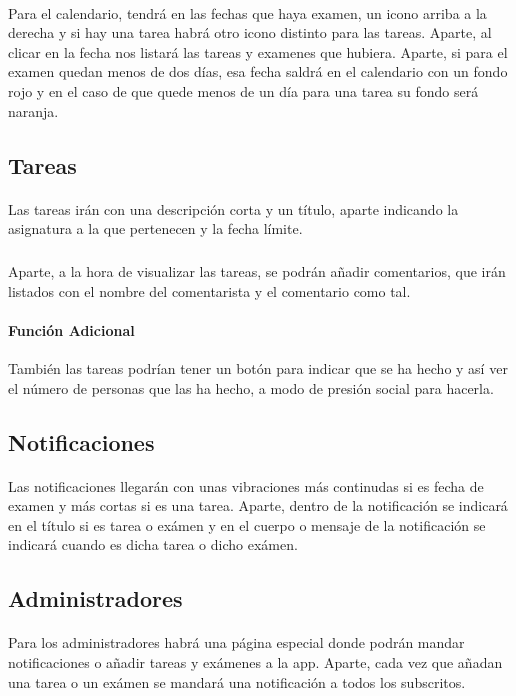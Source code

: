 \documentclass[a4paper]{article}
\begin{document}
\paragraph{}
Para el calendario, tendrá en las fechas que haya examen, un icono arriba a la derecha
y si hay una tarea habrá otro icono distinto para las tareas. Aparte, al clicar en la fecha
nos listará las tareas y examenes que hubiera. Aparte, si para el examen quedan menos de dos
días, esa fecha saldrá en el calendario con un fondo rojo y en el caso de que quede menos de
un día para una tarea su fondo será naranja.
\subsection[Tareas]{Tareas}
\paragraph{}
Las tareas irán con una descripción corta y un título, aparte indicando la asignatura a la
que pertenecen y la fecha límite.

\subparagraph{}
Aparte, a la hora de visualizar las tareas, se podrán añadir comentarios, que irán listados
con el nombre del comentarista y el comentario como tal.
\paragraph{Función Adicional}
También las tareas podrían tener un botón para indicar que se ha hecho y así ver
el número de personas que las ha hecho, a modo de presión social para hacerla.

\subsection[Notificaciones]{Notificaciones}
\paragraph{}
Las notificaciones llegarán con unas vibraciones más continudas si es fecha de examen y más cortas si
es una tarea. Aparte, dentro de la notificación se indicará en el título si es tarea o exámen y
en el cuerpo o mensaje de la notificación se indicará cuando es dicha tarea o dicho exámen.

\subsection[Administradores]{Administradores}
\paragraph{}
Para los administradores habrá una página especial donde podrán mandar notificaciones o añadir 
tareas y exámenes a la app. Aparte, cada vez que añadan una tarea o un exámen se mandará una 
notificación a todos los subscritos.
\end{document}
